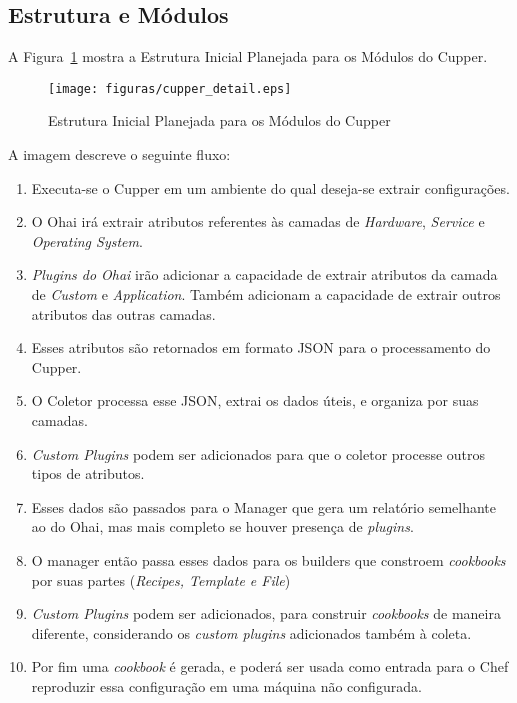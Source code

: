 \subsection{Estrutura e Módulos}

A Figura~\ref{fig:cupper-detail} mostra a Estrutura Inicial Planejada para os 
Módulos do Cupper.

\begin{figure}[H]
  \centering
  \caption{Estrutura Inicial Planejada para os Módulos do Cupper}
  \label{fig:cupper-detail}
  \texttt{[image: figuras/cupper\_detail.eps]}
\end{figure}

A imagem descreve o seguinte fluxo:

\begin{enumerate}
    \item Executa-se o Cupper em um ambiente do qual deseja-se extrair configurações.
    \item O Ohai irá extrair atributos referentes às camadas de \textit{Hardware},
\textit{Service} e \textit{Operating System}.
    \item \textit{Plugins do Ohai} irão adicionar a capacidade de extrair atributos da
camada de \textit{Custom} e \textit{Application}. Também adicionam a capacidade
de extrair outros atributos das outras camadas.
    \item Esses atributos são retornados em formato JSON para o processamento
do Cupper.
    \item O Coletor processa esse JSON, extrai os dados úteis, e organiza
por suas camadas.
    \item \textit{Custom Plugins} podem ser adicionados para que o coletor
processe outros tipos de atributos.
    \item Esses dados são passados para o Manager que gera um relatório semelhante
ao do Ohai, mas mais completo se houver presença de \textit{plugins}.
    \item O manager então passa esses dados para os builders que constroem
\textit{cookbooks} por suas partes (\textit{Recipes, Template e File})
    \item \textit{Custom Plugins} podem ser adicionados, para construir
\textit{cookbooks} de maneira diferente, considerando os \textit{custom plugins}
adicionados também à coleta.
    \item Por fim uma \textit{cookbook} é gerada, e poderá ser usada como 
entrada para o Chef reproduzir essa configuração em uma máquina não
configurada.
\end{enumerate}
